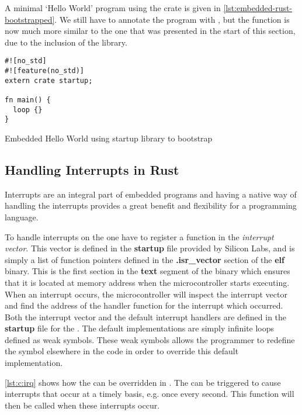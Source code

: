 A minimal `Hello World' program using the  crate is given in \autoref{lst:embedded-rust-bootstrapped}.
We still have to annotate the program with \code{\#[no\_std]}, but the  function is now much more similar to the one that was presented in the start of this section, due to the inclusion of the  library.

\begin{listing}[H]
  \begin{verbatim}
#![no_std]
#![feature(no_std)]
extern crate startup;

fn main() {
  loop {}
}
  \end{verbatim}
  \caption{Embedded Hello World using startup library to bootstrap}
  \label{lst:embedded-rust-bootstrapped}
\end{listing}

\subsection{Handling Interrupts in Rust}
\label{sec:impl:handling-interrupts}

Interrupts are an integral part of embedded programs and having a native way of handling the interrupts provides a great benefit and flexibility for a programming language.

To handle interrupts on the {\gecko} one have to register a function in the \emph{interrupt vector}.
This vector is defined in the \textbf{startup} file provided by Silicon Labs, and is simply a list of function pointers defined in the \textbf{.isr\_vector} section of the \textbf{elf} binary.
This is the first section in the \textbf{text} segment of the binary which ensures that it is located at memory address  when the microcontroller starts executing.
When an interrupt occurs, the microcontroller will inspect the interrupt vector and find the address of the handler function for the interrupt which occurred.
Both the interrupt vector and the default interrupt handlers are defined in the \textbf{startup} file for the {\gecko}.
The default implementations are simply infinite loops defined as weak symbols.
These weak symbols allows the programmer to redefine the symbol elsewhere in the code in order to override this default implementation.

\autoref{lst:c:irq} shows how the  can be overridden in {\C}.
The {\gecko} can be triggered to cause interrupts that occur at a timely basis, e.g. once every second.
This function will then be called when these interrupts occur.

